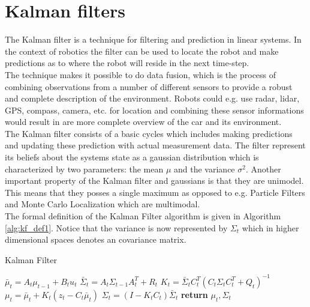 
\section{Kalman filters}

The Kalman filter is a technique for filtering and prediction in linear systems. In the context of robotics the filter can be used to locate the robot and make predictions as to where the robot will reside in the next time-step.\\

The technique makes it possible to do data fusion, which is the process of combining observations from a number of different sensors to provide a robust and complete description of the environment. Robots could e.g. use radar, lidar, GPS, compass, camera, etc. for location and combining these sensor informations would result in are more complete overview of the car and its environment.\\

The Kalman filter consists of a basic cycles which includes making predictions and updating these prediction with actual measurement data. The filter represent its beliefs about the systems state as a gaussian distribution which is characterized by two parameters: the mean $\mu$ and the variance $\sigma^2$. Another important property of the Kalman filter and gaussians is that they are unimodel. This means that they posses a single maximum as opposed to e.g. Particle Filters and Monte Carlo Localization which are multimodal.\\

The formal definition of the Kalman Filter algorithm is given in Algorithm \ref{alg:kf_def1}. Notice that the variance is now represented by $\Sigma_{t}$ which in higher dimensional spaces denotes an covariance matrix.

\begin{center}
\begin{minipage}{.65\linewidth}
\begin{algorithm}[H]
\caption{Kalman Filter}
\label{alg:kf_def1}
\begin{algorithmic}[1]
  \State $\bar\mu_{t} = A_{t}\mu_{t-1} + B_{t}u_{t}$%
  \State $\bar\Sigma_{t} = A_{t}\Sigma_{t-1}A_{t}^T + R_{t}$
  \State $K_{t} = \bar\Sigma_{t}C_{t}^T(C_{t}\Sigma_{t}C_{t}^T+Q_{t})^{-1}$
  \State $\mu_{t} = \bar\mu_{t} + K_{t}(z_{t} - C_{t}\bar\mu_{t})$
  \State $\Sigma_{t} = (I - K_{t}C_{t})\bar\Sigma_{t}$
  \State \textbf{return} $\mu_{t}, \Sigma_{t}$
\EndProcedure
\end{algorithmic}
\end{algorithm}
\end{minipage}
\end{center}

